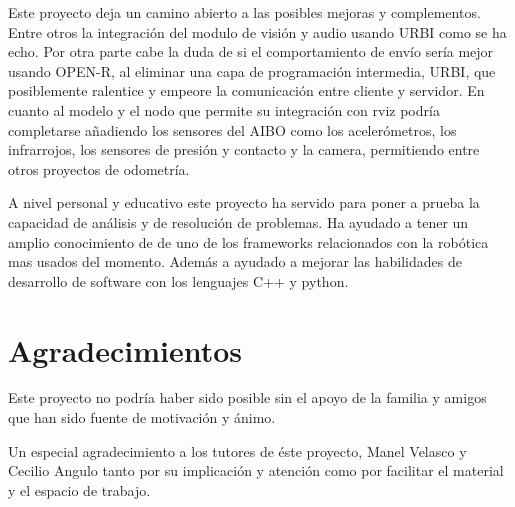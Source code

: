 \documentclass[12pt,a4paper,final,twoside]{book}
\begin{document}
Este proyecto deja un camino abierto a las posibles mejoras y complementos. Entre otros la integración del modulo de visión y audio usando URBI como se ha echo. Por otra parte cabe la duda de si el comportamiento de envío sería mejor usando OPEN-R, al eliminar una capa de programación intermedia, URBI, que posiblemente ralentice y empeore la comunicación entre cliente y servidor. En cuanto al modelo y el nodo que permite su integración con rviz podría completarse añadiendo los sensores del AIBO como los acelerómetros, los infrarrojos, los sensores de presión y contacto y la camera, permitiendo entre otros proyectos de odometría.

A nivel personal y educativo este proyecto ha servido para poner a prueba la capacidad de análisis y de resolución de problemas. Ha ayudado a tener un amplio conocimiento de de uno de los frameworks relacionados con la robótica mas usados del momento. Además a ayudado a mejorar las habilidades de desarrollo de software con los lenguajes C++ y python. 

\newpage
\chapter*{Agradecimientos}
\thispagestyle{fancy}
Este proyecto no podría haber sido posible sin el apoyo de la familia y amigos que han sido fuente de motivación y ánimo.

Un especial agradecimiento a los tutores de éste proyecto, Manel Velasco y Cecilio Angulo tanto por su implicación y atención como por facilitar el material y el espacio de trabajo.
\end{document}
